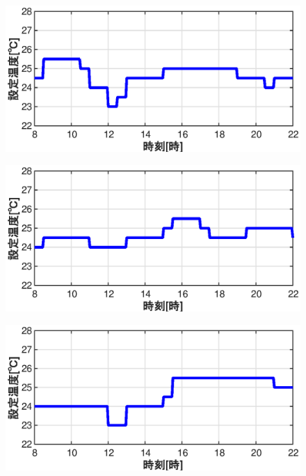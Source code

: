 \begin{figure}[htbp]
\begin{center}
\begin{minipage}{0.4\textwidth}
\begin{center}
        \includegraphics[width=1.0\textwidth,keepaspectratio=true]{fig/math_result_schedule_settemp_h.eps}\\
      \end{center}
    \end{minipage}
    \begin{minipage}{0.4\textwidth}
      \begin{center}
        \includegraphics[width=1.0\textwidth,keepaspectratio=true]{fig/math_result_schedule_settemp_i.eps}\\
      \end{center}
    \end{minipage}
    \begin{minipage}{0.4\textwidth}
      \begin{center}
        \includegraphics[width=1.0\textwidth,keepaspectratio=true]{fig/math_result_schedule_settemp_j.eps}\\

\end{center}
\end{minipage}
\end{center}
\end{figure}
